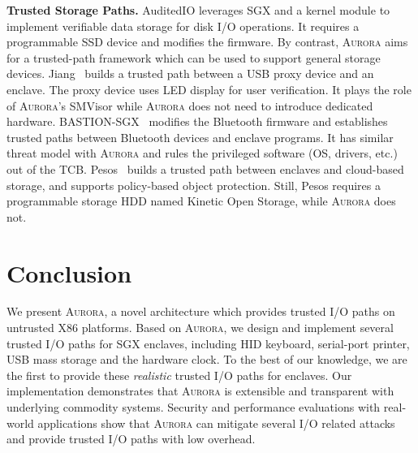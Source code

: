 \textbf{Trusted Storage Paths.}
AuditedIO \cite{DBLP:conf/apsys/BalakrishnanCBS17} leverages SGX and a kernel module to implement verifiable data storage for disk I/O operations. It requires a programmable SSD device and modifies the firmware.
By contrast, \textsc{Aurora} aims for a trusted-path framework which can be used to support general storage devices. %
Jiang~\cite{Jang2017Building} builds a trusted path between a USB proxy device and an enclave. The proxy device uses LED display for user verification. It plays the role of  \textsc{Aurora}'s SMVisor while \textsc{Aurora} does not need to introduce dedicated hardware. %
BASTION-SGX~\cite{DBLP:conf/isca/PetersLVPK18} modifies the Bluetooth firmware and establishes trusted paths between Bluetooth  devices and enclave programs. It has similar threat model with \textsc{Aurora} and rules the privileged software (OS, drivers, etc.) out of the TCB. %
Pesos~\cite{DBLP:conf/eurosys/KrahnTVKBF18} builds a trusted path between enclaves and cloud-based storage, and supports policy-based object protection. Still, Pesos requires a programmable storage HDD named Kinetic Open Storage, while \textsc{Aurora} does not.


\section{Conclusion}

We present \textsc{Aurora}, a novel architecture which provides trusted I/O paths on untrusted X86 platforms. Based on \textsc{Aurora}, we design and implement several trusted I/O paths for SGX enclaves, including HID keyboard, serial-port printer, USB mass storage and the hardware clock. To the best of our knowledge, we are the first to provide these \emph{realistic} trusted I/O paths for enclaves. Our implementation demonstrates that \textsc{Aurora} is extensible and transparent with underlying commodity systems. Security and performance evaluations with real-world applications show that \textsc{Aurora} can mitigate several I/O related attacks and provide trusted I/O paths with low overhead.


